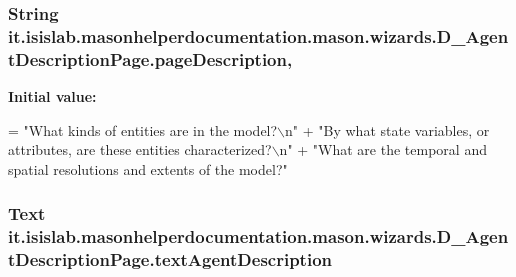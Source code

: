 \hypertarget{classit_1_1isislab_1_1masonhelperdocumentation_1_1mason_1_1wizards_1_1_d___agent_description_page_a8ba359bbeadb34933a78f865581fdf15}{
\subsubsection[{page\-Description}]{\setlength{\rightskip}{0pt plus 5cm}String it.\-isislab.\-masonhelperdocumentation.\-mason.\-wizards.\-D\-\_\-\-Agent\-Description\-Page.\-page\-Description\hspace{0.3cm}{\ttfamily [static]}, {\ttfamily [private]}}}\label{classit_1_1isislab_1_1masonhelperdocumentation_1_1mason_1_1wizards_1_1_d___agent_description_page_a8ba359bbeadb34933a78f865581fdf15}
{\bfseries Initial value\-:}
\begin{DoxyCode}
= \textcolor{stringliteral}{"What kinds of entities are in the model?\(\backslash\)n"}
                                          + \textcolor{stringliteral}{"By what state variables, or attributes, are these entities
       characterized?\(\backslash\)n"}
                                          + \textcolor{stringliteral}{"What are the temporal and spatial resolutions and extents of
       the model?"}
\end{DoxyCode}
\hypertarget{classit_1_1isislab_1_1masonhelperdocumentation_1_1mason_1_1wizards_1_1_d___agent_description_page_adeaf5a5649c9280ceb38690357c70a1b}{
\subsubsection[{text\-Agent\-Description}]{\setlength{\rightskip}{0pt plus 5cm}Text it.\-isislab.\-masonhelperdocumentation.\-mason.\-wizards.\-D\-\_\-\-Agent\-Description\-Page.\-text\-Agent\-Description\hspace{0.3cm}{\ttfamily [private]}}}\label{classit_1_1isislab_1_1masonhelperdocumentation_1_1mason_1_1wizards_1_1_d___agent_description_page_adeaf5a5649c9280ceb38690357c70a1b}



